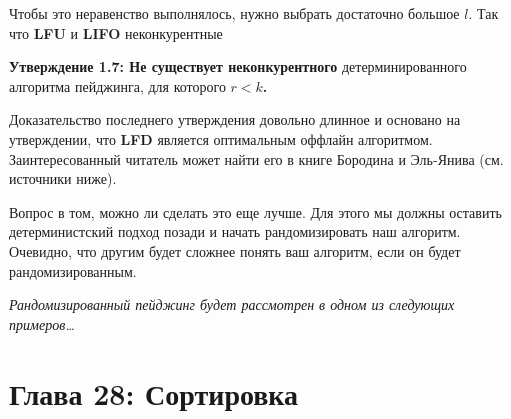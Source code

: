 \vspace{\baselineskip}

Чтобы это неравенство выполнялось, нужно выбрать достаточно большое $l$. Так что \textbf{LFU} и \textbf{LIFO} неконкурентные

\vspace{\baselineskip}

\textbf{Утверждение 1.7: Не существует неконкурентного} детерминированного алгоритма пейджинга, для которого \textbf{$r<k$.}

\vspace{\baselineskip}

Доказательство последнего утверждения довольно длинное и основано на утверждении, что \textbf{LFD} является оптимальным оффлайн алгоритмом. Заинтересованный читатель может найти его в книге Бородина и Эль-Янива (см. источники ниже).

\vspace{\baselineskip}

Вопрос в том, можно ли сделать это еще лучше. Для этого мы должны оставить детерминистский подход позади и начать рандомизировать наш алгоритм. Очевидно, что другим будет сложнее понять ваш алгоритм, если он будет рандомизированным.

\vspace{\baselineskip}

{\it Рандомизированный пейджинг будет рассмотрен в одном из следующих примеров\dots}

\chapter*{Глава 28: Сортировка}

